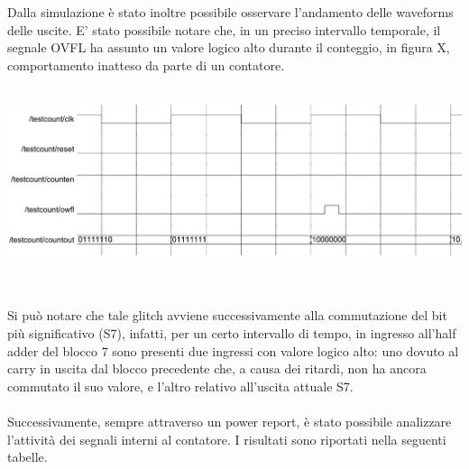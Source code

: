 \documentclass[11pt,  english, makeidx, a4paper, titlepage, oneside]{book}
\begin{document}
\\\\
Dalla simulazione è stato inoltre possibile osservare l'andamento 
delle waveforms delle uscite. E' stato possibile notare che, in
un preciso intervallo temporale, il segnale OVFL ha assunto un valore 
logico alto durante il conteggio, in figura X, comportamento inatteso da parte
di un contatore. 
\\\\
\centerline{\includegraphics[width=15cm]{./img/Lab_1/Es_5/Glitch.png}}
\\\\
Si può notare che tale glitch avviene successivamente alla commutazione
del bit più significativo (S7), infatti, per un certo intervallo di tempo,
in ingresso all'half adder del blocco 7 sono presenti due ingressi con valore
logico alto: uno dovuto al carry in uscita dal blocco precedente che, a causa
dei ritardi, non ha ancora commutato il suo valore, e l'altro relativo all'uscita
attuale S7.
\\\\
Successivamente, sempre attraverso un power report, è stato possibile
analizzare l'attività dei segnali interni al contatore. I risultati sono 
riportati nella seguenti tabelle.
\\
\end{document}
